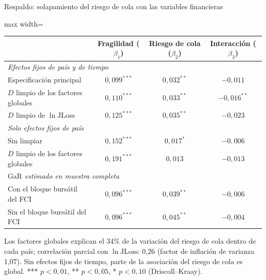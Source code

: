 \documentclass[aspectratio=169]{beamer}
\newcommand{\JLoss}{\mathrm{JLoss}}
\newcommand{\GaR}{\mathrm{GaR}}
\begin{document}
\begin{frame}{Respaldo: solapamiento del riesgo de cola con las variables financieras}
\centering
\footnotesize
\begin{adjustbox}{max width=\textwidth}
\begin{tabular}{l ccc}
\toprule
 & Fragilidad ($\beta_1$) & Riesgo de cola ($\beta_2$) & Interacción ($\beta_3$) \\
\midrule
\multicolumn{4}{l}{\textit{Efectos fijos de país y de tiempo}} \\
\quad Especificación principal & $0{,}099^{***}$ & $0{,}032^{**}$ & $-0{,}011$ \\
\quad $D$ limpio de los factores globales & $0{,}110^{***}$ & $0{,}033^{**}$ & $-0{,}016^{**}$ \\
\quad $D$ limpio de $\ln\JLoss$ & $0{,}125^{***}$ & $0{,}035^{**}$ & $-0{,}023$ \\
\multicolumn{4}{l}{\textit{Solo efectos fijos de país}} \\
\quad Sin limpiar & $0{,}152^{***}$ & $0{,}017^{*}$ & $-0{,}006$ \\
\quad $D$ limpio de los factores globales & $0{,}191^{***}$ & $0{,}013$ & $-0{,}013$ \\
\multicolumn{4}{l}{\textit{$\GaR$ estimado en muestra completa}} \\
\quad Con el bloque bursátil del FCI & $0{,}096^{***}$ & $0{,}039^{**}$ & $-0{,}006$ \\
\quad Sin el bloque bursátil del FCI & $0{,}096^{***}$ & $0{,}045^{**}$ & $-0{,}004$ \\
\bottomrule
\end{tabular}
\end{adjustbox}
\vspace{4pt}

{\scriptsize\raggedright Los factores globales explican el 34\% de la variación del riesgo de cola dentro de cada país; correlación parcial con $\ln\JLoss$: 0,26 (factor de inflación de varianza 1,07). Sin efectos fijos de tiempo, parte de la asociación del riesgo de cola es global. *** $p<0{,}01$, ** $p<0{,}05$, * $p<0{,}10$ (Driscoll--Kraay).\par}
\end{frame}
\end{document}

